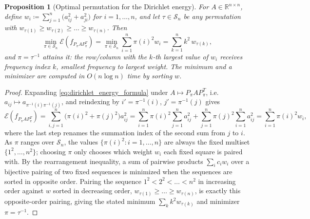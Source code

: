 \documentclass[11pt,a4paper,reqno]{amsart}
\newtheorem{proposition}[theorem]{Proposition}
\theoremstyle{definition}
\numberwithin{equation}{section}
\newcommand{\R}{\mathbb{R}}
\begin{document}
\begin{proposition}[Optimal permutation for the Dirichlet energy]
\label{prop:optimal_permutation}
For $A \in \R^{n \times n}$, define $w_i \coloneqq \sum_{j=1}^n \bigl(a_{ij}^2 + a_{ji}^2\bigr)$ for $i = 1, \dots, n$, and let $\tau \in \mathcal{S}_n$ be any permutation with $w_{\tau(1)} \ge w_{\tau(2)} \ge \dots \ge w_{\tau(n)}$. Then
\begin{equation}
    \label{eq:optimal_permutation}
    \min_{\pi \in \mathcal{S}_n} \mathcal{E}(f_{P_\pi A P_\pi^T}) = \min_{\pi \in \mathcal{S}_n} \sum_{i=1}^n \pi(i)^2 w_i = \sum_{k=1}^n k^2\, w_{\tau(k)},
\end{equation}
and $\pi = \tau^{-1}$ attains it: the row/column with the $k$-th largest value of $w_i$ receives frequency index $k$, smallest frequency to largest weight. The minimum and a minimizer are computed in $O(n \log n)$ time by sorting $w$.
\end{proposition}

\begin{proof}
Expanding \eqref{eq:dirichlet_energy_formula} under $A \mapsto P_\pi A P_\pi^T$, i.e.\ $a_{ij} \mapsto a_{\pi^{-1}(i)\pi^{-1}(j)}$, and reindexing by $i' = \pi^{-1}(i)$, $j' = \pi^{-1}(j)$ gives
\begin{equation}
    \mathcal{E}(f_{P_\pi A P_\pi^T}) = \sum_{i,j=1}^n \bigl(\pi(i)^2 + \pi(j)^2\bigr) a_{ij}^2 = \sum_{i=1}^n \pi(i)^2 \sum_{j=1}^n a_{ij}^2 + \sum_{j=1}^n \pi(j)^2 \sum_{i=1}^n a_{ij}^2 = \sum_{i=1}^n \pi(i)^2 w_i,
\end{equation}
where the last step renames the summation index of the second sum from $j$ to $i$. As $\pi$ ranges over $\mathcal{S}_n$, the values $\{\pi(i)^2 : i = 1,\dots,n\}$ are always the fixed multiset $\{1^2, \dots, n^2\}$; choosing $\pi$ only chooses which weight $w_i$ each fixed square is paired with. By the rearrangement inequality, a sum of pairwise products $\sum_i c_i w_i$ over a bijective pairing of two fixed sequences is minimized when the sequences are sorted in opposite order. Pairing the sequence $1^2 < 2^2 < \dots < n^2$ in increasing order against $w$ sorted in decreasing order, $w_{\tau(1)} \ge \dots \ge w_{\tau(n)}$, is exactly this opposite-order pairing, giving the stated minimum $\sum_k k^2 w_{\tau(k)}$ and minimizer $\pi = \tau^{-1}$.
\end{proof}
\end{document}
